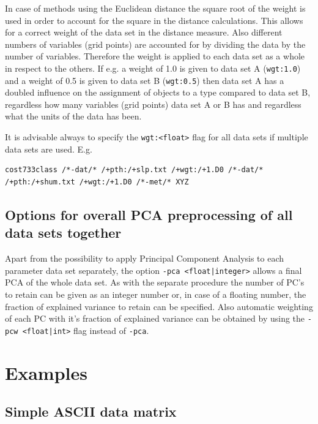 \documentclass[12pt, oneside, a4paper, headsepline, plainheadsepline]{scrbook}
\begin{document}
In case of methods using the Euclidean distance 
the square root of the weight is used in order to account for the square in the distance 
calculations. This allows for a correct weight of the data set in the distance measure. 
Also different numbers of variables (grid points) are accounted for by dividing the data by 
the number of variables. Therefore the weight is applied to each data set as a whole in respect 
to the others.
If e.g. a weight of 1.0 is given to data set A (\verb+wgt:1.0+) and a weight of 0.5 is given to 
data set B (\verb+wgt:0.5+) then data set A has a doubled influence on the assignment of objects 
to a type compared to data set B, regardless how many variables (grid points) data set A or B has 
and regardless what the units of the data has been.

It is advisable always to specify the \verb+wgt:<float>+ flag for all data sets if multiple data 
sets are used. E.g.

\begin{lstlisting}
cost733class /*-dat/* /+pth:/+slp.txt /+wgt:/+1.D0 /*-dat/* /+pth:/+shum.txt /+wgt:/+1.D0 /*-met/* XYZ
\end{lstlisting}

\subsection{Options for overall PCA preprocessing of all data sets together}
Apart from the possibility to apply Principal Component Analysis to each parameter data set separately,
 the option \verb+-pca <float|integer>+ allows a final PCA of the whole data set. As with the separate
 procedure the number of PC's to retain can be given as an integer number or, in case of a floating number,
 the fraction of explained variance to retain can be specified. Also automatic weighting of each PC with it's fraction of explained variance can be obtained by using the \verb+-pcw <float|int>+ flag instead of \verb+-pca+.

\section{Examples}


\subsection{Simple ASCII data matrix}
\end{document}
